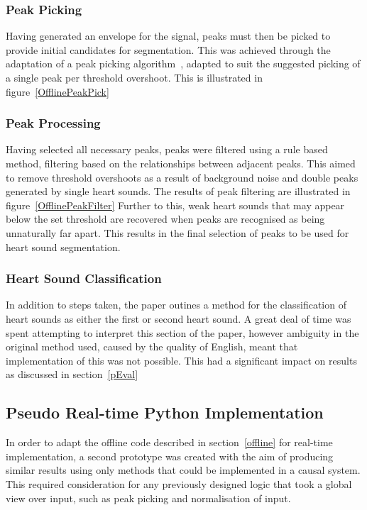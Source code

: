 \documentclass[titlepage]{scrartcl}
\begin{document}
\subsubsection{Peak Picking}
Having generated an envelope for the signal, peaks must then be picked to
provide initial candidates for segmentation. This was achieved through the
adaptation of a peak picking algorithm~\parencite{PeakUtils}, adapted to suit the
suggested picking of a single peak per threshold overshoot. This is illustrated
in figure~\ref{OfflinePeakPick}

\subsubsection{Peak Processing}
Having selected all necessary peaks, peaks were filtered using a rule based
method, filtering based on the relationships between adjacent peaks. This aimed
to remove threshold overshoots as a result of background noise and double peaks
generated by single heart sounds.
The results of peak filtering are illustrated in figure~\ref{OfflinePeakFilter}
Further to this, weak heart sounds that may appear below the set threshold are
recovered when peaks are recognised as being unnaturally far apart. This
results in the final selection of peaks to be used for heart sound
segmentation.

\subsubsection{Heart Sound Classification}
In addition to steps taken, the paper outines a method for the classification
of heart sounds as either the first or second heart sound. A great deal of time
was spent attempting to interpret this section of the paper, however ambiguity
in the original method used, caused by the quality of English, meant that
implementation of this was not possible. This had a significant impact on
results as discussed in section~\ref{pEval}

\subsection{Pseudo Real-time Python Implementation}
In order to adapt the offline code described in section~\ref{offline} for
real-time implementation, a second
prototype was created with the aim of producing similar results using only
methods that could be implemented in a causal system. This required
consideration for any previously designed logic that took a global view over
input, such as peak picking and normalisation of input.
\end{document}
